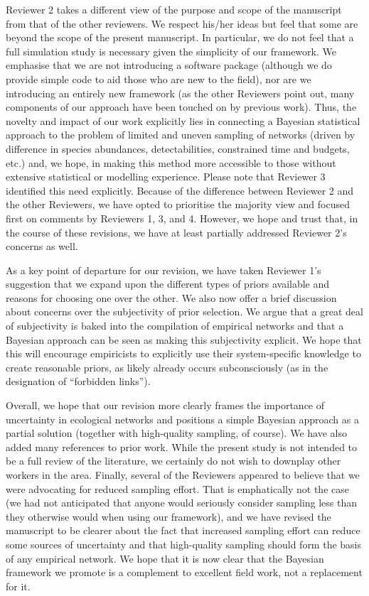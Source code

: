 \documentclass[12pt]{letter}
\begin{document}
	Reviewer 2 takes a different view of the purpose and scope of the manuscript from that of the other reviewers. We respect his/her ideas but feel that some are beyond the scope of the present manuscript. In particular, we do not feel that a full simulation study is necessary given the simplicity of our framework. We emphasise that we are not introducing a software package (although we do provide simple code to aid those who are new to the field), nor are we introducing an entirely new framework (as the other Reviewers point out, many components of our approach have been touched on by previous work). Thus, the novelty and impact of our work explicitly lies in connecting a Bayesian statistical approach to the problem of limited and uneven sampling of networks (driven by difference in species abundances, detectabilities, constrained time and budgets, etc.) and, we hope, in making this method more accessible to those without extensive statistical or modelling experience. Please note that Reviewer 3 identified this need explicitly. 
	Because of the difference between Reviewer 2 and the other Reviewers, we have opted to prioritise the majority view and focused first on comments by Reviewers 1, 3, and 4. However, we hope and trust that, in the course of these revisions, we have at least partially addressed Reviewer 2's concerns as well. 


	As a key point of departure for our revision, we have taken Reviewer 1's suggestion that we expand upon the different types of priors available and reasons for choosing one over the other. We also now offer a brief discussion about concerns over the subjectivity of prior selection. We argue that a great deal of subjectivity is baked into the compilation of empirical networks and that a Bayesian approach can be seen as making this subjectivity explicit. We hope that this will encourage empiricists to explicitly use their system-specific knowledge to create reasonable priors, as likely already occurs subconsciously (as in the designation of ``forbidden links''). 


	Overall, we hope that our revision more clearly frames the importance of uncertainty in ecological networks and positions a simple Bayesian approach as a partial solution (together with high-quality sampling, of course). 
	We have also added many references to prior work. While the present study is not intended to be a full review of the literature, we certainly do not wish to downplay other workers in the area.
	Finally, several of the Reviewers appeared to believe that we were advocating for reduced sampling effort. That is emphatically not the case (we had not anticipated that anyone would seriously consider sampling less than they otherwise would when using our framework), and we have revised the manuscript to be clearer about the fact that increased sampling effort can reduce some sources of uncertainty and that high-quality sampling should form the basis of any empirical network. We hope that it is now clear that the Bayesian framework we promote is a complement to excellent field work, not a replacement for it.
\end{document}
